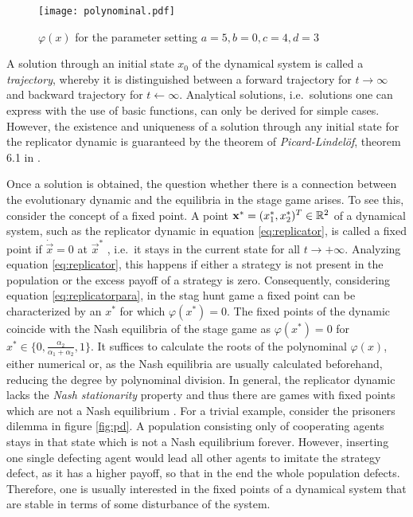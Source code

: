 \begin{figure}[h]
        \centering
        \texttt{[image: polynominal.pdf]}
        \caption[Polynominal of the Replicator Dynamic]{$\varphi(x)$ for the parameter setting $a=5, b=0, c=4, d=3$}
        \label{fig:polynominal}
\end{figure}
A solution through an initial state $x_0$ of the dynamical system is called a 
\textit{trajectory}, whereby it is distinguished between a forward trajectory 
for $t \rightarrow \infty$ and backward trajectory for $t \leftarrow \infty$.
Analytical solutions, i.e.\ solutions one can express with the use of
basic functions, can only be derived for simple cases. 
However, the existence and uniqueness of a solution through
any initial state for the replicator dynamic is guaranteed by the theorem 
of \textit{Picard-Lindel\"of}, theorem 6.1 in 
\textcite[74]{weibull_evolutionary_1997}. 

Once a solution is obtained, the question whether there 
is a connection between the evolutionary dynamic and the equilibria in the 
stage game arises. To see this, consider the concept of a fixed point.
A point $\mathbf{x}^*=(x^*_1,x^*_2)^T \in \mathbb{R}^2$ of a dynamical system, such as the replicator 
dynamic in equation \eqref{eq:replicator}, is called a fixed point
if $\dot{\vec{x}} = 0$ at $\vec{x}^*$ , i.e.\ it stays in the 
current state for all $t \rightarrow + \infty $. 
Analyzing equation \eqref{eq:replicator}, 
this happens if either a strategy
is not present in the population or the excess payoff of a strategy is zero. 
Consequently, considering equation \eqref{eq:replicatorpara}, in the stag 
hunt game a fixed point can be characterized by an $x^*$ for which
$\varphi(x^*) = 0$.
The fixed points of the dynamic coincide 
with the Nash equilibria of the stage game as 
$\varphi(x^*) = 0$ for $x^* \in \{0,\frac{\alpha_2}{\alpha_1+\alpha_2},1\}$. 
It suffices to calculate the roots of the polynominal $\varphi(x)$, either
numerical or, as the Nash equilibria are usually calculated beforehand,
reducing the degree by polynominal division. In general, the replicator 
dynamic lacks the \textit{Nash stationarity} property and thus there are 
games with fixed points which are not a Nash equilibrium
\parencite{sandholm_population_2010}.
For a trivial example, consider the prisoners dilemma in figure \ref{fig:pd}. 
A population consisting only of cooperating agents stays in that state
which is not a Nash equilibrium forever. However, inserting one single 
defecting agent would lead all other agents to imitate the strategy defect,
as it has a higher payoff, so that in the end the whole population defects.
Therefore, one is usually interested in the fixed points of 
a dynamical system that are stable in terms of some 
disturbance of the system. 

